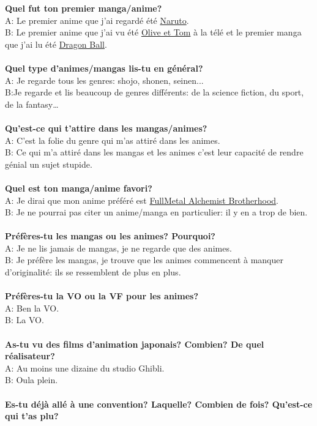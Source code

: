 \textbf{Quel fut ton premier manga/anime?}\\
A: Le premier anime que j'ai regardé été \underline{Naruto}.\\
B: Le premier anime que j'ai vu été \underline{Olive et Tom} à la télé et le
premier manga que j'ai lu été \underline{Dragon Ball}.\\
\\
\textbf{Quel type d'animes/mangas lis-tu en général?}\\
A: Je regarde tous les genres: shojo, shonen, seinen...\\
B:Je regarde et lis beaucoup de genres différents: de la science fiction, du
sport, de la fantasy\ldots\\
\\
\textbf{Qu'est-ce qui t'attire dans les mangas/animes?}\\
A: C'est la folie du genre qui m'as attiré dans les animes.\\
B: Ce qui m'a attiré dans les mangas et les animes c'est leur capacité de
rendre génial un sujet stupide.\\
\\
\textbf{Quel est ton manga/anime favori?}\\
A: Je dirai que mon anime préféré est \underline{FullMetal Alchemist
Brotherhood}.\\
B: Je ne pourrai pas citer un anime/manga en particulier: il y en a trop de
bien.\\
\\
\textbf{Préfères-tu les mangas ou les animes? Pourquoi?}\\
A: Je ne lis jamais de mangas, je ne regarde que des animes.\\
B: Je préfère les mangas, je trouve que les animes commencent à manquer
d'originalité: ils se ressemblent de plus en plus.\\
\\
\textbf{Préfères-tu la VO ou la VF pour les animes?}\\
A: Ben la VO.\\
B: La VO.\\
\\
\textbf{As-tu vu des films d'animation japonais? Combien? De quel réalisateur?}\\
A: Au moins une dizaine du studio Ghibli.\\
B: Oula plein.\\
\\
\textbf{Es-tu déjà allé à une convention? Laquelle? Combien de fois? Qu'est-ce qui t'as plu?}\\
